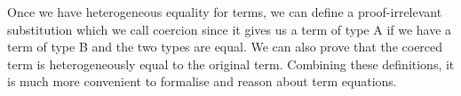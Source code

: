 \documentclass{acm_proc_article-sp}
\begin{document}
Once we have heterogeneous equality for terms, we can define a proof-irrelevant substitution which we call coercion
since it gives us a term of type A if we have a term of type B and the
two types are equal. We can also prove that the coerced term is heterogeneously equal to the
original term. Combining these definitions, it is much
more convenient to formalise and reason about term equations.
\end{document}
